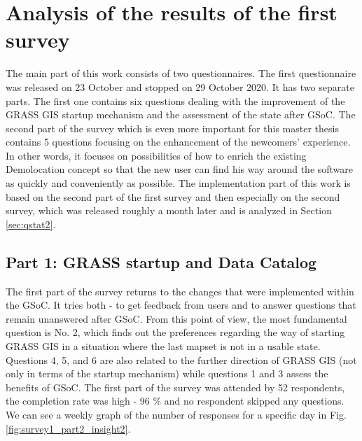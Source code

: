 \documentclass[a4paper,10pt,twoside]{article}
\begin{document}

\newpage
\vspace*{-1cm}
\section{Analysis of the results of the first survey}
\label{sec:qstat}

\noindent The main part of this work consists of two questionnaires. The first questionnaire was released on 23 October and stopped on 29 October 2020. It has two separate parts. The first one contains six questions dealing with the improvement of the GRASS GIS startup mechanism and the assessment of the state after GSoC. The second part of the survey which is even more important for this master thesis contains 5 questions focusing on the enhancement of the newcomers' experience. In other words, it focuses on possibilities of how to enrich the existing Demolocation concept so that the new user can find his way around the software as quickly and conveniently as possible. The implementation part of this work is based on the second part of the first survey and then especially on the second survey, which was released roughly a month later and is analyzed in Section \ref{sec:qstat2}.

\subsection{Part 1: GRASS startup and Data Catalog}

\noindent The first part of the survey returns to the changes that were implemented within the GSoC. It tries both - to get feedback from users and to answer questions that remain unanswered after GSoC. From this point of view, the most fundamental question is No. 2, which finds out the preferences regarding the way of starting GRASS GIS in a situation where the last mapset is not in a usable state. Questions 4, 5, and 6 are also related to the further direction of GRASS GIS (not only in terms of the startup mechanism) while questions 1 and 3 assess the benefits of GSoC. The first part of the survey was attended by 52 respondents, the completion rate was high - 96 \% and no respondent skipped any questions. We can see a weekly graph of the number of responses for a specific day in Fig. \ref{fig:survey1_part2_insight2}.
\end{document}
